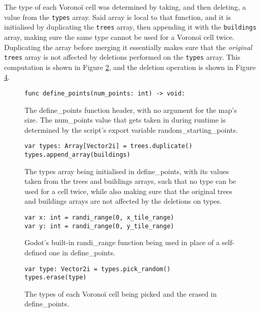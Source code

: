 The type of each Voronoï cell was determined by taking, and then deleting, a value from the \verb|types| array. Said array is local to that function, and it is initialised by duplicating the \verb|trees| array, then appending it with the \verb|buildings| array, making sure the same type cannot be used for a Voronoï cell twice. Duplicating the array before merging it essentially makes sure that the \textit{original} \verb|trees| array is not affected by deletions performed on the \verb|types| array. This computation is shown in Figure \ref{fig:voronoi2}, and the deletion operation is shown in Figure \ref{fig:voronoi4}.

\begin{figure}[H]
    \centering
    \begin{lstlisting}
func define_points(num_points: int) -> void:
    \end{lstlisting}
    \caption{The define\_points function header, with no argument for the map's size. The num\_points value that gets taken in during runtime is determined by the script's export variable random\_starting\_points.}
    \label{fig:voronoi1}
\end{figure}

\begin{figure}[H]
    \centering
    \begin{lstlisting}
var types: Array[Vector2i] = trees.duplicate()
types.append_array(buildings)
    \end{lstlisting}
    \caption{The types array being initialised in define\_points, with its values taken from the trees and buildings arrays, such that no type can be used for a cell twice, while also making sure that the original trees and buildings arrays are not affected by the deletions on types.}
    \label{fig:voronoi2}
\end{figure}

\begin{figure}[H]
    \centering
    \begin{lstlisting}
var x: int = randi_range(0, x_tile_range)
var y: int = randi_range(0, y_tile_range)
    \end{lstlisting}
    \caption{Godot's built-in randi\_range function being used in place of a self-defined one in define\_points.}
    \label{fig:voronoi3}
\end{figure}

\begin{figure}[H]
    \centering
    \begin{lstlisting}
var type: Vector2i = types.pick_random()
types.erase(type)
    \end{lstlisting}
    \caption{The types of each Voronoï cell being picked and the erased in define\_points.}
    \label{fig:voronoi4}
\end{figure}